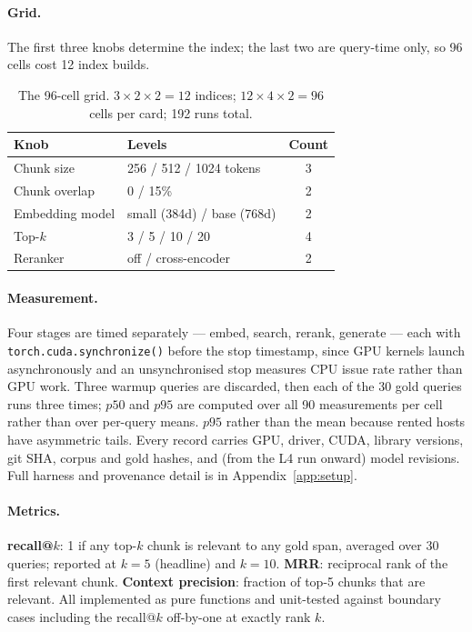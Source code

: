 \paragraph{Grid.} The first three knobs determine the index; the last two are
query-time only, so 96 cells cost 12 index builds.

\begin{table}[htbp]
\centering\small
\caption{The 96-cell grid. $3\times2\times2 = 12$ indices;
$12\times4\times2 = 96$ cells per card; 192 runs total.}
\label{tab:grid}
\begin{tabular}{@{}llc@{}}
\toprule
Knob & Levels & Count \\
\midrule
Chunk size      & 256 / 512 / 1024 tokens    & 3 \\
Chunk overlap   & 0 / 15\%                   & 2 \\
Embedding model & small (384d) / base (768d) & 2 \\
Top-$k$         & 3 / 5 / 10 / 20            & 4 \\
Reranker        & off / cross-encoder        & 2 \\
\bottomrule
\end{tabular}
\end{table}

\paragraph{Measurement.} Four stages are timed separately --- embed, search,
rerank, generate --- each with \texttt{torch.cuda.synchronize()} before the stop
timestamp, since GPU kernels launch asynchronously and an unsynchronised stop
measures CPU issue rate rather than GPU work. Three warmup queries are
discarded, then each of the 30 gold queries runs three times; $p50$ and $p95$
are computed over all 90 measurements per cell rather than over per-query means.
$p95$ rather than the mean because rented hosts have asymmetric tails. Every
record carries GPU, driver, CUDA, library versions, git SHA, corpus and gold
hashes, and (from the L4 run onward) model revisions. Full harness and
provenance detail is in Appendix~\ref{app:setup}.

\paragraph{Metrics.} \textbf{recall@$k$}: 1 if any top-$k$ chunk is relevant to
any gold span, averaged over 30 queries; reported at $k=5$ (headline) and
$k=10$. \textbf{MRR}: reciprocal rank of the first relevant chunk.
\textbf{Context precision}: fraction of top-5 chunks that are relevant. All
implemented as pure functions and unit-tested against boundary cases including
the recall@$k$ off-by-one at exactly rank $k$.

